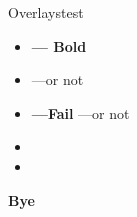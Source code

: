 \documentclass{beamer}
\begin{document}
\begin{frame}{Overlays}{test}

\begin{itemize}
  \item \textbf {--- Bold}
  \item {} ---or not
  \item \textbf<2->{---Fail} ---or not
  \item {}
  \item \color[rgb]{1,0,0}{---red}
\end{itemize}

\leftprotrusion\textbf<1>{Bye}

\end{frame}
\end{document}
